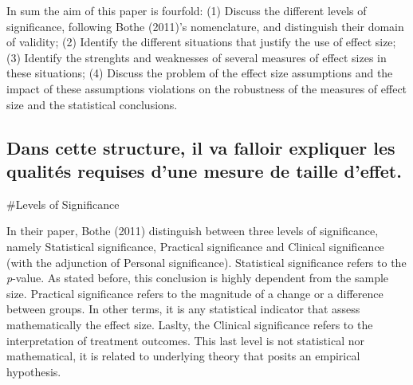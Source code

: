 \documentclass[man]{apa6}
\begin{document}
In sum the aim of this paper is fourfold: (1) Discuss the different levels of significance, following Bothe (2011)'s nomenclature, and distinguish their domain of validity; (2) Identify the different situations that justify the use of effect size; (3) Identify the strenghts and weaknesses of several measures of effect sizes in these situations; (4) Discuss the problem of the effect size assumptions and the impact of these assumptions violations on the robustness of the measures of effect size and the statistical conclusions.

\hypertarget{dans-cette-structure-il-va-falloir-expliquer-les-qualituxe9s-requises-dune-mesure-de-taille-deffet.}{%
\subsection{Dans cette structure, il va falloir expliquer les qualités requises d'une mesure de taille d'effet.}\label{dans-cette-structure-il-va-falloir-expliquer-les-qualituxe9s-requises-dune-mesure-de-taille-deffet.}}

\#Levels of Significance

In their paper, Bothe (2011) distinguish between three levels of significance, namely Statistical significance, Practical significance and Clinical significance (with the adjunction of Personal significance). Statistical significance refers to the \emph{p}-value. As stated before, this conclusion is highly dependent from the sample size. Practical significance refers to the magnitude of a change or a difference between groups. In other terms, it is any statistical indicator that assess mathematically the effect size. Laslty, the Clinical significance refers to the interpretation of treatment outcomes. This last level is not statistical nor mathematical, it is related to underlying theory that posits an empirical hypothesis.
\end{document}

